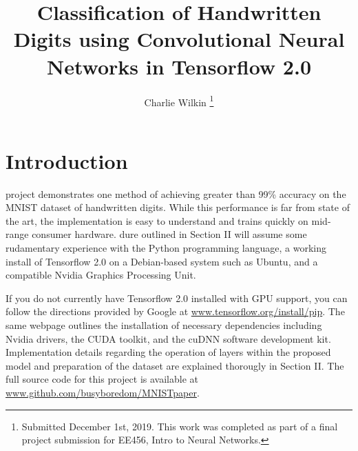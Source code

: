 \documentclass[transmag]{IEEEtran}
\begin{document}
\title{Classification of Handwritten Digits using Convolutional Neural Networks
in Tensorflow 2.0}

\author{Charlie Wilkin
\thanks{Submitted December 1st, 2019. This work was completed as part of a 
final project submission for EE456, Intro to Neural Networks.}}


\maketitle

\section{Introduction}

 project demonstrates one method of achieving greater than
99\% accuracy on the MNIST dataset of handwritten digits. While this
performance is far from state of the art, the implementation is easy to
understand and trains quickly on mid-range consumer hardware.  
dure outlined in Section II will assume some rudamentary experience with the
Python programming language, a working install of Tensorflow 2.0 on
a Debian-based system such as Ubuntu, and a compatible Nvidia Graphics
Processing Unit. 

If you do not currently have Tensorflow 2.0 installed with GPU support, you
can follow the directions provided by Google at 
\href{https://www.tensorflow.org/install/gpu}{www.tensorflow.org/install/pip}.
The same webpage outlines the installation of necessary dependencies including
Nvidia drivers, the CUDA toolkit, and the cuDNN software development kit. 
Implementation details regarding the operation of layers within the proposed
model and preparation of the dataset are explained thorougly in Section II. The
full source code for this project is available at 
\href{https://www.github.com/busyboredom/MNISTpaper}
{www.github.com/busyboredom/MNISTpaper}.
\end{document}
